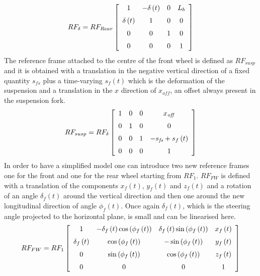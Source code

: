%
\begin{equation}
    RF_{\delta} = RF_{Rear} 
    \left[ \begin {array}{cccc} 1&-\delta \left( t \right) &0&L_{b}
    \\ \noalign{\medskip}\delta \left( t \right) &1&0&0
    \\ \noalign{\medskip}0&0&1&0\\ \noalign{\medskip}0&0&0&1\end {array}
     \right]    
\end{equation}
%
The reference frame attached to the centre of the front wheel is defined as $RF_{susp}$ and it is obtained with a translation in the negative vertical direction of a fixed quantity $s_{fs}$ plus a time-varying $s_f(t)$ which is the deformation of the suspension and a translation in the $x$ direction of $x_{off}$, an offset always present in the suspension fork.
%
\begin{equation}
    RF_{susp} = RF_\delta 
    \left[ \begin {array}{cccc} 1&0&0&x_{{\it off}}\\ \noalign{\medskip}0
    &1&0&0\\ \noalign{\medskip}0&0&1&-s_{{\it fs}}+s_{f} \left( t \right) 
    \\ \noalign{\medskip}0&0&0&1\end {array} \right] 
\end{equation}
%
In order to have a simplified model one can introduce two new reference frames one for the front and one for the rear wheel starting from $RF_1$. $RF_{FW}$ is defined with a translation of the components $x_f(t)$, $y_f(t)$ and $z_f(t)$ and a rotation of an angle $\delta_f(t)$ around the vertical direction and then one around the new longitudinal direction of angle $\phi_f(t)$. Once again $\delta_f(t)$, which is the steering angle projected to the horizontal plane, is small and can be linearised here.
%
\begin{equation}
    RF_{FW} = RF_1 
    \left[ \begin {array}{cccc} 1&-\delta_{f} \left( t \right) \cos
    \left( \phi_{f} \left( t \right)  \right) &\delta_{f} \left( t
    \right) \sin \left( \phi_{f} \left( t \right)  \right) &x_{f} \left( 
    t \right) \\ \noalign{\medskip}\delta_{f} \left( t \right) &\cos
    \left( \phi_{f} \left( t \right)  \right) &-\sin \left( \phi_{f}
    \left( t \right)  \right) &y_{f} \left( t \right) 
    \\ \noalign{\medskip}0&\sin \left( \phi_{f} \left( t \right)  \right) 
    &\cos \left( \phi_{f} \left( t \right)  \right) &z_{f} \left( t
    \right) \\ \noalign{\medskip}0&0&0&1\end {array} \right] 
\end{equation}
